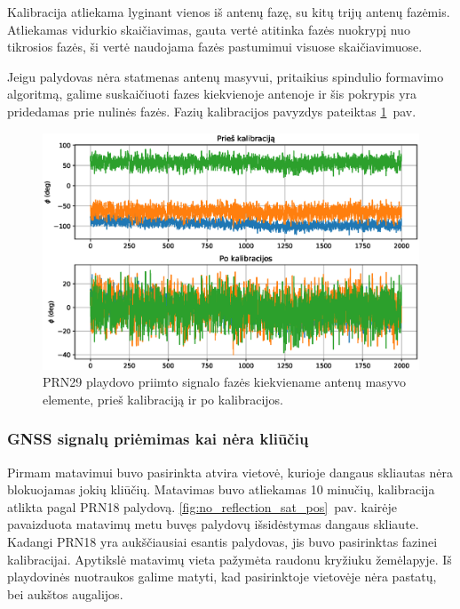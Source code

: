 \documentclass[main.tex]{subfiles}
\begin{document}
Kalibracija atliekama lyginant vienos iš antenų fazę, su kitų trijų antenų fazėmis.
Atliekamas vidurkio skaičiavimas, gauta vertė atitinka fazės nuokrypį nuo tikrosios
fazės, ši vertė naudojama fazės pastumimui visuose skaičiavimuose.

Jeigu palydovas nėra statmenas antenų masyvui, pritaikius spindulio formavimo
algoritmą, galime suskaičiuoti fazes kiekvienoje antenoje ir šis pokrypis
yra pridedamas prie nulinės fazės. Fazių kalibracijos pavyzdys pateiktas
\ref{fig:gnss_phase_calibration}~pav.

\begin{figure}[ht]
    \begin{centering}
    \includegraphics[scale=0.65]{drawings/phase_calibration}
    \par\end{centering}
    \protect\caption{\label{fig:gnss_phase_calibration}PRN29 playdovo priimto signalo fazės kiekviename antenų masyvo elemente, prieš kalibraciją ir po kalibracijos.}
\end{figure}

\subsubsection{GNSS signalų priėmimas kai nėra kliūčių}\label{sec:gnss_meas_no_reflection}

Pirmam matavimui buvo pasirinkta atvira vietovė, kurioje dangaus skliautas nėra blokuojamas
jokių kliūčių. Matavimas buvo atliekamas 10 minučių, kalibracija atlikta pagal PRN18 palydovą.
\ref{fig:no_reflection_sat_pos}~pav. kairėje pavaizduota matavimų metu buvęs palydovų išsidėstymas
dangaus skliaute. Kadangi PRN18 yra aukščiausiai esantis palydovas, jis buvo pasirinktas
fazinei kalibracijai. Apytikslė matavimų vieta pažymėta raudonu kryžiuku žemėlapyje.
Iš playdovinės nuotraukos galime matyti, kad pasirinktoje vietovėje nėra pastatų,
bei aukštos augalijos.
\end{document}
